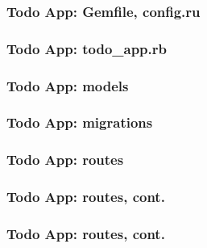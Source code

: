 \documentclass{beamer}
\begin{document}
\begin{frame}[fragile]\frametitle{Todo App: Gemfile, config.ru} 
  
  

  
    
\end{frame}



\begin{frame}[fragile]\frametitle{Todo App: todo\_app.rb} 
  
  

\end{frame}




\begin{frame}[fragile]\frametitle{Todo App: models} 
  
  

  
    
\end{frame}




\begin{frame}[fragile]\frametitle{Todo App: migrations} 
  
  
    
\end{frame}




\begin{frame}[fragile]\frametitle{Todo App: routes} 
  
  

\end{frame}




\begin{frame}[fragile]\frametitle{Todo App: routes, cont.} 
  
  
        
\end{frame}




\begin{frame}[fragile]\frametitle{Todo App: routes, cont.} 
  
  
    
\end{frame}
\end{document}
